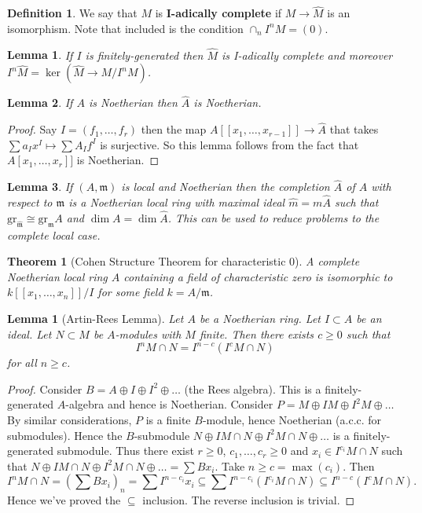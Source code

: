 \documentclass{article}
\newcommand{\fr}{\mathfrak}
\theoremstyle{plain}
\newtheorem*{thm*}{Theorem}
\newtheorem{lem}[thm]{Lemma}
\newtheorem*{lem*}{Lemma}
\theoremstyle{definition}
\newtheorem{defn}{Definition}
\theoremstyle{remark}
\begin{document}
\begin{defn}
We say that $M$ is \textbf{I-adically complete} if $M\to \hat M$ is an isomorphism. Note that included is the condition $\cap_n I^nM=(0)$.
\end{defn}

\begin{lem*}
If $I$ is finitely-generated then $\hat M$ is I-adically complete and moreover $I^n\hat M=\ker(\hat M\to M/I^nM)$.
\end{lem*}

\begin{lem*}
If $A$ is Noetherian then $\hat A$ is Noetherian.
\end{lem*}
\begin{proof}
Say $I=(f_1,\ldots, f_r)$ then the map
$A[[x_1,\ldots,x_{r-1}]]\to \hat A$ that takes $\sum a_Ix^I\mapsto \sum A_If^I$ is surjective. So this lemma follows from the fact that $A[x_1,\ldots,x_r]]$ is Noetherian.
\end{proof}

\begin{lem*}
If $(A,\fr m)$ is local and Noetherian then the completion $\hat A$ of $A$ with respect to $\fr m$ is a Noetherian local ring with maximal ideal $\hat m=m\hat A$ such that $\text{gr}_{\hat{\fr m}}\cong\text{gr}_{\fr m}A$ and $\dim A=\dim\hat A$. This can be used to reduce problems to the complete local case.
\end{lem*}

\begin{thm*}[Cohen Structure Theorem for characteristic 0]
A complete Noetherian local ring $A$ containing a field of characteristic zero is isomorphic to $k[[x_1,\ldots,x_n]]/I$ for some field $k=A/\fr m$.
\end{thm*}

\begin{lem}[Artin-Rees Lemma]
Let $A$ be a Noetherian ring. Let $I\subset A$ be an ideal. Let $N\subset M$ be $A$-modules with $M$ finite. Then there exists $c\geq 0$ such that
\[I^nM\cap N=I^{n-c}(I^cM\cap N)\]
for all $n\geq c$.
\end{lem}

\begin{proof}
Consider $B=A\oplus I\oplus I^2\oplus\ldots$ (the Rees algebra). This is a finitely-generated $A$-algebra and hence is Noetherian. Consider $P=M\oplus IM\oplus I^2M\oplus\ldots$ By similar considerations, $P$ is a finite $B$-module, hence Noetherian (a.c.c. for submodules). Hence the $B$-submodule $N\oplus IM\cap N\oplus I^2M\cap N\oplus\ldots$ is a finitely-generated submodule. Thus there exist $r\geq 0$, $c_1,\ldots,c_r\geq 0$ and $x_i\in I^{c_i}M\cap N$ such that $N\oplus IM\cap N\oplus I^2M\cap N\oplus\ldots=\sum Bx_i$. Take $n\geq c=\max(c_i)$. Then
\[I^nM\cap N=\left(\sum Bx_i\right)_n=\sum I^{n-c_i}x_i\subseteq\sum I^{n-c_i}(I^{c_i}M\cap N)\subseteq I^{n-c}(I^cM\cap N).\]
Hence we've proved the $\subseteq$ inclusion. The reverse inclusion is trivial.
\end{proof}
\end{document}
